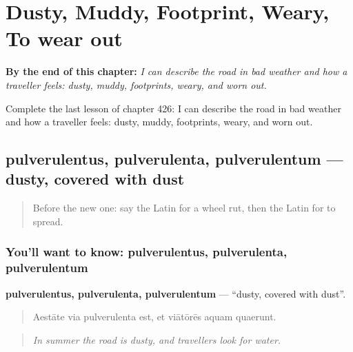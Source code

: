 
\chapter{Dusty, Muddy, Footprint, Weary, To wear out}
\label{ch:la-dusty-muddy-footprint-weary-to-wear-out}

\begin{chapteropening}
\textbf{By the end of this chapter:} \emph{I can describe the road in bad weather and how a traveller feels: dusty, muddy, footprints, weary, and worn out.}

Complete the last lesson of chapter 426: I can describe the road in bad weather and how a traveller feels: dusty, muddy, footprints, weary, and worn out.
\end{chapteropening}

\section[pulverulentus, pulverulenta …]{pulverulentus, pulverulenta, pulverulentum — dusty, covered with dust}

\label{lesson:LA-C426-pulverulentus}



\begin{quote}
Before the new one: say the Latin for a wheel rut, then the Latin for to spread.
\end{quote}

\subsection*{You'll want to know: pulverulentus, pulverulenta, pulverulentum}
\textbf{pulverulentus, pulverulenta, pulverulentum} — \textquotedblleft{}dusty, covered with dust\textquotedblright{}.

\begin{quote}
Aestāte via pulverulenta est, et viātōrēs aquam quaerunt.
\end{quote}

\begin{quote}
\emph{In summer the road is dusty, and travellers look for water.}
\end{quote}

